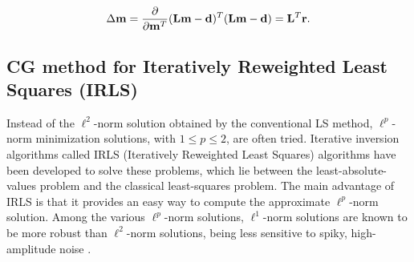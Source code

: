 \begin{equation}
\Delta \mathbf m = 
{\partial \over \partial \mathbf m^T }
(\mathbf L\mathbf m -\mathbf d)^T(\mathbf L\mathbf m -\mathbf d)
= \mathbf L^T\mathbf r  .
\end{equation}

\subsection{CG method for Iteratively Reweighted Least Squares (IRLS)}

Instead of the $\ell^2$-norm solution obtained by the conventional LS method, 
$\ell^p$-norm minimization solutions, with $1\le p \le2$, are often tried. 
Iterative inversion algorithms called IRLS 
(Iteratively Reweighted Least Squares) 
algorithms have been developed to solve these problems, which lie
between the least-absolute-values problem and the classical least-squares problem.
The main advantage of IRLS is that it provides an easy way to compute 
the approximate $\ell^p$-norm solution.
Among the various $\ell^p$-norm solutions, 
$\ell^1$-norm solutions are known to be more robust than $\ell^2$-norm solutions, 
being less sensitive to spiky, high-amplitude noise 
\cite{GEO38.05.08260844,GEO44-01-00390052,GIT00-00-00250050,SEG-1988-S7.1}.

